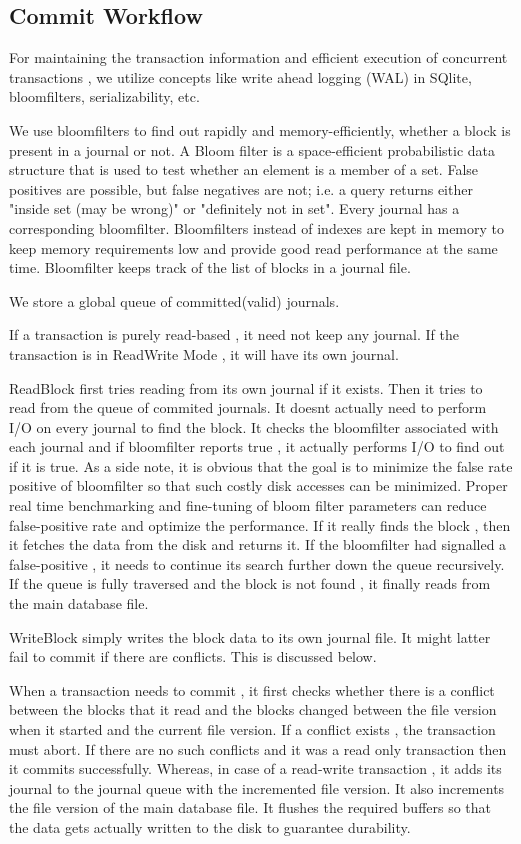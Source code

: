 \documentclass[11pt,a4paper]{article}
\begin{document}
\subsection{Commit Workflow}
For maintaining the transaction information and efficient execution of concurrent transactions , we utilize concepts like write ahead logging (WAL) in SQlite, bloomfilters, serializability, etc.

We use bloomfilters to find out rapidly and memory-efficiently, whether a block is present in a journal or not.
A Bloom filter is a space-efficient probabilistic data structure that is used to test whether an element is a member of a set. False positives are possible, but false negatives are not; i.e. a query returns either "inside set (may be wrong)" or "definitely not in set".
Every journal has a corresponding bloomfilter. Bloomfilters instead of indexes are kept in memory to keep memory requirements low and provide good read performance at the same time.
Bloomfilter keeps track of the list of blocks in a journal file.

We store a global queue of committed(valid) journals.

If a transaction is purely read-based , it need not keep any journal. 
If the transaction is in ReadWrite Mode , it will have its own journal. 

ReadBlock first tries reading from its own journal if it exists. Then it tries to read from the queue of commited journals. It doesnt actually need to perform I/O on every journal to find the block. It checks the bloomfilter associated with each journal and if bloomfilter reports true , it actually performs I/O to find out if it is true. As a side note, it is obvious that the goal is to minimize the false rate positive of bloomfilter so that such costly disk accesses can be minimized. Proper real time benchmarking and fine-tuning of bloom filter parameters can reduce false-positive rate and optimize the performance. If it really finds the block , then it fetches the data from the disk and returns it. If the bloomfilter had signalled a false-positive , it needs to continue its search further down the queue recursively. If the queue is fully traversed and the block is not found , it finally reads from the main database file. 
 
WriteBlock simply writes the block data to its own journal file. It might latter fail to commit if there are conflicts. This is discussed below.

When a transaction needs to commit , it first checks whether there is a conflict between the blocks that it read and the blocks changed between the file version when it started and the current file version. If a conflict exists , the transaction must abort. If there are no such conflicts and it was a read only transaction then it commits successfully. Whereas,  in case of a read-write transaction , it adds its journal to the journal queue with the incremented file version. It also increments the file version of the main database file. It flushes the required buffers so that the data gets actually written to the disk to guarantee durability.
\end{document}
